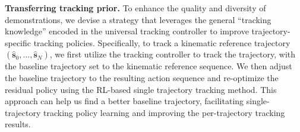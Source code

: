 




\noindent\textbf{Transferring tracking prior.} 
To enhance the quality and diversity of demonstrations, we devise a strategy that leverages the general ``tracking knowledge'' encoded in the universal tracking controller to improve trajectory-specific tracking policies. Specifically, to track a kinematic reference trajectory \((\hat{\mathbf{s}}_0, ..., \hat{\mathbf{s}}_N)\), we first utilize the tracking controller to track the trajectory, with the baseline trajectory set to the kinematic reference sequence. We then adjust the baseline trajectory to the resulting action sequence and re-optimize the residual policy using the RL-based single trajectory tracking method. This approach can help us find a better baseline trajectory, facilitating single-trajectory tracking policy learning and improving the per-trajectory tracking results.


